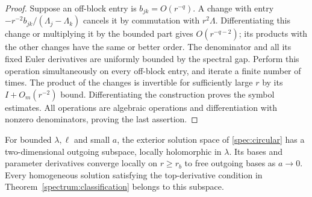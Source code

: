 \begin{proof}
Suppose an off-block entry is $b_{jk}=O(r^{-q})$. A change with entry
$-r^{-2}b_{jk}/(\Lambda_j-\Lambda_k)$ cancels it by commutation with
$r^2\Lambda$. Differentiating this change or multiplying it by the
bounded part gives $O(r^{-q-2})$; its products with the other changes
have the same or better order. The denominator and all its fixed
Euler derivatives are uniformly bounded by the spectral gap.
Perform this operation simultaneously on every off-block entry, and
iterate a finite number of times. The product of the changes is
invertible for sufficiently large $r$ by its $I+O_m(r^{-2})$ bound.
Differentiating the construction proves the symbol estimates. All
operations are algebraic operations and differentiation with nonzero
denominators, proving the last assertion.
\end{proof}

\begin{lemma}\label{spec:slow-basis}
For bounded $\lambda,\ell$ and small $a$, the exterior solution space
of \eqref{spec:circular} has a two-dimensional outgoing subspace,
locally holomorphic in $\lambda$. Its bases and parameter derivatives
converge locally on $r\ge r_b$ to free outgoing bases as $a\to0$.
Every homogeneous solution satisfying the top-derivative condition
in Theorem~\ref{spectrum:classification} belongs to this subspace.
\end{lemma}

